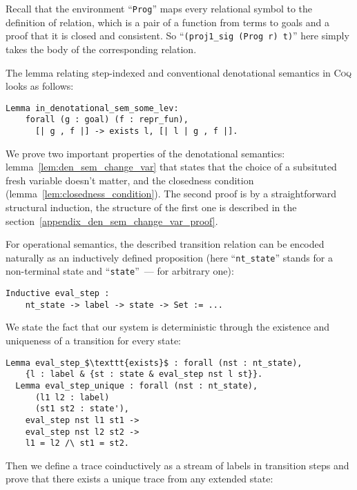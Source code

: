 Recall that the environment ``\lstinline[language=Coq]|Prog|'' maps every relational symbol to the definition of relation,
which is a pair of a function from terms to goals and a proof that it is closed and consistent.
So ``\lstinline[language=Coq]|(proj1_sig (Prog r) t)|'' here simply takes the body of the corresponding relation.

The lemma relating step-indexed and conventional denotational semantics in \textsc{Coq} looks as follows:

\begin{lstlisting}[language=Coq] 
  Lemma in_denotational_sem_some_lev:
    forall (g : goal) (f : repr_fun),
      [| g , f |] -> exists l, [| l | g , f |].
\end{lstlisting}

We prove two important properties of the denotational semantics: lemma~\ref{lem:den_sem_change_var} that states that the choice of a subsituted fresh variable doesn't matter, and the closedness condition (lemma~\ref{lem:closedness_condition}). The second proof is by a straightforward structural induction, the structure of the first one is described in the section~\ref{appendix_den_sem_change_var_proof}.

For operational semantics, the described transition relation can be encoded naturally as an inductively defined proposition (here ``\lstinline|nt_state|''
stands for a non-terminal state and ``\lstinline|state|''~--- for arbitrary one):

\begin{lstlisting}[language=Coq]
  Inductive eval_step :
    nt_state -> label -> state -> Set := ...
\end{lstlisting}

We state the fact that our system is deterministic through the existence and uniqueness of a transition for every state:

\begin{lstlisting}[language=Coq]
  Lemma eval_step_$\texttt{exists}$ : forall (nst : nt_state),
    {l : label & {st : state & eval_step nst l st}}.
  Lemma eval_step_unique : forall (nst : nt_state),
      (l1 l2 : label)
      (st1 st2 : state'),
    eval_step nst l1 st1 ->
    eval_step nst l2 st2 ->
    l1 = l2 /\ st1 = st2.
\end{lstlisting}

Then we define a trace coinductively as a stream of labels in transition steps and prove that there exists a unique trace from any extended state:

